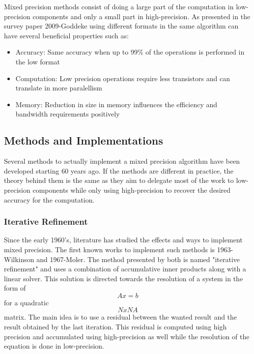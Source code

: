 Mixed precision methods consist of doing a large part of the computation in low-precision components and only a small part in high-precision. As presented in the survey paper 2009-Goddeke using different formats in the same algorithm can have several beneficial properties such as:
\begin{itemize}
  \item Accuracy: Same accuracy when up to 99\% of the operations is performed in the low format
  \item Computation: Low precision operations require less transistors and can translate in more paralellism
  \item Memory: Reduction in size in memory influences the efficiency and bandwidth requirements positively
\end{itemize}

\subsection{Methods and Implementations}
Several methods to actually implement a mixed precision algorithm have been developed starting 60 years ago. If the methods are different in practice, the theory behind them is the same as they aim to delegate most of the work to low-precision components while only using high-precision to recover the desired accuracy for the computation.
\subsubsection{Iterative Refinement}

Since the early 1960's, literature has studied the effects and ways to implement mixed precision. The first known works to implement such methods is 1963-Wilkinson and 1967-Moler. The method presented by both is named "iterative refinement" and uses a combination of accumulative inner products along with a linear solver. This solution is directed towards the resolution of a system in the form of \begin{equation} Ax=b \end{equation} for a quadratic \begin{equation} NxN A\end{equation} matrix. The main idea is to use a residual between the wanted result and the result obtained by the last iteration. This residual is computed using high precision and accumulated using high-precision as well while the resolution of the equation is done in low-precision.

